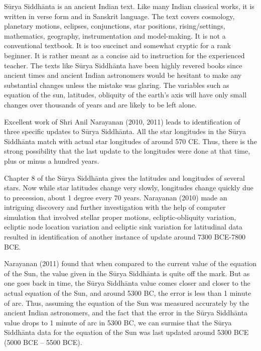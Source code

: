 Sūrya Siddhānta is an ancient Indian text. Like many Indian classical works, it is written in verse form and in Sanskrit language. The text covers cosmology, planetary motions, eclipses, conjunctions, star positions, rising/settings, mathematics, geography, instrumentation and model-making. It is not a conventional textbook. It is too succinct and somewhat cryptic for a rank beginner. It is rather meant as a concise aid to instruction for the experienced teacher. The texts like Sūrya Siddhānta have been highly revered books since ancient times and ancient Indian astronomers would be hesitant to make any substantial changes unless the mistake was glaring. The variables such as equation of the sun, latitudes, obliquity of the earth's axis will have only small changes over thousands of years and are likely to be left alone.

\vskip 3pt

Excellent work of Shri Anil Narayanan (2010, 2011) leads to identification of three specific updates to Sūrya Siddhānta. All the star longitudes in the Sūrya Siddhānta match with actual star longitudes of around 570 CE. Thus, there is the strong possibility that the last update to the longitudes were done at that time, plus or minus a hundred years.

\vskip 3pt

Chapter 8 of the Sūrya Siddhānta gives the latitudes and longitudes of several stars. Now while star latitudes change very slowly, longitudes change quickly due to precession, about 1 degree every 70 years. Narayanan (2010) made an intriguing discovery and further investigation with the help of computer simulation that involved stellar proper motions, ecliptic-obliquity variation, ecliptic node location variation and ecliptic sink variation for latitudinal data resulted in identification of another instance of update around 7300 BCE-7800 BCE.

\vskip 3pt

Narayanan (2011) found that when compared to the current value of the equation of the Sun, the value given in the Sūrya Siddhānta is quite off the mark. But as one goes back in time, the Sūrya Siddhānta value comes closer and closer to the actual equation of the Sun, and around 5300 BC, the error is less than 1 minute of arc. Thus, assuming the equation of the Sun was measured accurately by the ancient Indian astronomers, and the fact that the error in the Sūrya Siddhānta value drops to 1 minute of arc in 5300 BC, we can surmise that the Sūrya Siddhānta data for the equation of the Sun was last updated around 5300 BCE (5000 BCE – 5500 BCE).

